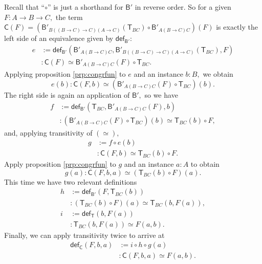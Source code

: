 \documentclass[a4paper]{article}
\theoremstyle{definition}
\theoremstyle{remark}
\renewcommand{\equiv}{\simeq}
\newcommand{\nm}{\mathsf}
\newcommand{\fndef}[1]{\nm{def}_{#1}}
\newcommand{\combinator}{\nm}
\newcommand{\revAppFun}{\combinator{T}}
\newcommand{\compFun}{\combinator{B'}}
\newcommand{\swapFun}{\combinator{C}}
\begin{document}
Recall that ``$\circ$'' is just a shorthand for $\compFun$ in reverse order. So for a given
$F : A \to B \to C,$ the term
$\swapFun(F) = (\compFun_{B((B{\to}C){\to}C)(A{\to}C)}(\revAppFun_{BC}) \circ \compFun_{A(B{\to}C)C})(F)$
is exactly the left side of an equivalence given by $\fndef{\compFun}$:
\begin{align*}
  e &:= \fndef{\compFun}(\compFun_{A(B{\to}C)C},\compFun_{B((B{\to}C){\to}C)(A{\to}C)}(\revAppFun_{BC}),F)\\
    &: \swapFun(F) \equiv \compFun_{A(B{\to}C)C}(F) \circ \revAppFun_{BC}.
\end{align*}
Applying proposition \ref{prp:congrfun} to $e$ and an instance $b : B,$ we obtain
\[e(b) : \swapFun(F,b) \equiv (\compFun_{A(B{\to}C)C}(F) \circ \revAppFun_{BC})(b).\]
The right side is again an application of $\compFun,$ so we have
\begin{align*}
  f &:= \fndef{\compFun}(\revAppFun_{BC},\compFun_{A(B{\to}C)C}(F),b)\\
    &: (\compFun_{A(B{\to}C)C}(F) \circ \revAppFun_{BC})(b) \equiv \revAppFun_{BC}(b) \circ F,
\end{align*}
and, applying transitivity of $(\equiv),$
\begin{align*}
  g &:= f \circ e(b)\\
    &: \swapFun(F,b) \equiv \revAppFun_{BC}(b) \circ F.
\end{align*}
Apply proposition \ref{prp:congrfun} to $g$ and an instance $a : A$ to obtain
\[g(a) : \swapFun(F,b,a) \equiv (\revAppFun_{BC}(b) \circ F)(a).\]
This time we have two relevant definitions
\begin{align*}
  h &:= \fndef{\compFun}(F,\revAppFun_{BC}(b))\\
    &: (\revAppFun_{BC}(b) \circ F)(a) \equiv \revAppFun_{BC}(b,F(a)),\\[1ex]
  i &:= \fndef{\revAppFun}(b,F(a))\\
    &: \revAppFun_{BC}(b,F(a)) \equiv F(a,b).
\end{align*}
Finally, we can apply transitivity twice to arrive at
\begin{align*}
  \fndef{\swapFun}(F,b,a) &:= i \circ h \circ g(a)\\
                          &: \swapFun(F,b,a) \equiv F(a,b).
\end{align*}
\end{document}
